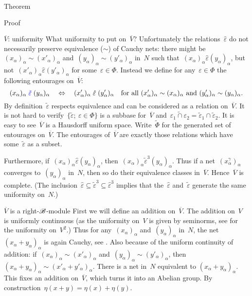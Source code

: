 \documentclass[b]{subfiles}
\begin{document}
\begin{parsec}
\begin{point}{Theorem}
\begin{point}{Proof}
\begin{point}{$\overline{V}$: uniformity}
What uniformity to put on~$\overline{V}$?
Unfortunately the relations~$\hat\varepsilon$ do not necessarily preserve
equivalence ($\sim$) of Cauchy nets:
    there might be~$(x_\alpha)_\alpha \sim (x'_\alpha)_\alpha$
    and~$(y_\alpha)_\alpha \sim (y'_\alpha)_\alpha$ in~$N$
such that~$(x_\alpha)_\alpha \mathrel{\hat\varepsilon} (y_\alpha)_\alpha$,
but not~$(x'_\alpha)_\alpha \mathrel{\hat\varepsilon} (y'_\alpha)_\alpha$
for some~$\varepsilon \in \Phi$.
Instead we define for any~$\varepsilon \in \Phi$
the following entourages on~$\overline{V}$:
\begin{equation*}
    (x_\alpha)_\alpha \mathrel{\Define{\tilde\varepsilon}}
    (y_\alpha)_\alpha \quad\Leftrightarrow\quad
    (x'_\alpha)_\alpha \mathrel{\hat\varepsilon}
    (y'_\alpha)_\alpha \quad
    \text{for all
        $(x'_\alpha)_\alpha \sim (x_\alpha)_\alpha$ 
    and $(y'_\alpha)_\alpha \sim (y_\alpha)_\alpha$.}
\end{equation*}
By definition~$\tilde\varepsilon$
respects equivalence and can be considered as a relation on~$\overline{V}$.
It is not hard to verify~$\{ \tilde\varepsilon ;\ \varepsilon \in \Phi\}$
is a subbase for~$\overline{V}$
and~$\widetilde{\varepsilon_1 \cap \varepsilon_2} = \tilde{\varepsilon}_1
\cap \tilde{\varepsilon}_2$.
It is easy to see~$\overline{V}$ is a Hausdorff uniform space.
Write~$\tilde\Phi$ for the generated set of entourages on~$\overline{V}$.
The entourages of~$\overline{V}$ are exactly those relations
    which have some~$\tilde\varepsilon$
    as a subset.

Furthermore, if~$(x_\alpha)_\alpha \mathrel{\hat\varepsilon}
(y_\alpha)_\alpha $,
then~$(x_\alpha)_\alpha \mathrel{\tilde\varepsilon^3} (y_\alpha)_\alpha$.
Thus if a net~$(x^\gamma_\alpha)_\alpha$
converges to~$(y_\alpha)_\alpha$ in~$N$,
then so do their equivalence classes in~$\overline{V}$.
Hence~$\overline{V}$ is complete.
(The inclusion~$\hat\varepsilon \subseteq \tilde\varepsilon^3 \subseteq
        \hat\varepsilon^3$
        implies that the~$\hat\varepsilon$ and~$\tilde\varepsilon$
        generate the same uniformity on~$N$.)
\end{point}
\begin{point}{$\overline{V}$ is a right-$\mathscr{B}$-module}%
    First we will define an addition on~$\overline{V}$.
    The addition on~$V$ is uniformly continuous
    (as the uniformity on~$V$ is given by seminorms,
    see  for the uniformity on~$V^2$.)
    Thus for any~$(x_\alpha)_\alpha$
    and~$(y_\alpha)_\alpha$ in~$N$,
    the net~$(x_\alpha+y_\alpha)_\alpha$ is again Cauchy,
        see .
    Also because of the uniform continuity of addition:
    if~$(x_\alpha)_\alpha \sim (x'_\alpha)_\alpha$
    and~$(y_\alpha)_\alpha \sim (y'_\alpha)_\alpha$,
    then~$(x_\alpha+y_\alpha)_\alpha \sim
            (x'_\alpha+y'_\alpha)_\alpha$.
    There is a net in~$N$ equivalent to $(x_\alpha+y_\alpha)_\alpha$.
    This fixes an addition on~$\overline{V}$,
        which turns it into an Abelian group.
        By construction~$\eta(x+y) = \eta(x)+\eta(y)$.


\end{point}
\end{point}
\end{point}
\end{parsec}
\end{document}
